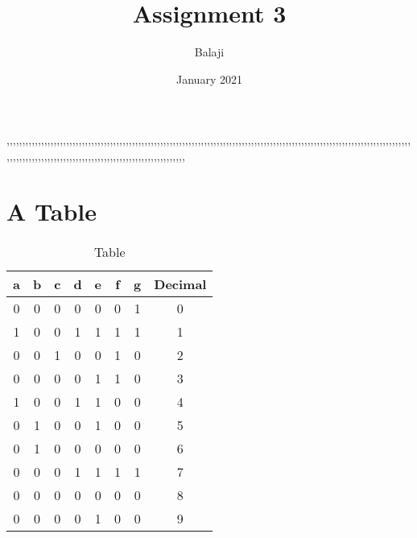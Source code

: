\documentclass{article}
\title{ Assignment 3}
\author{ Balaji }
\date{January 2021}
\begin{document}
\maketitle,,,,,,,,,,,,,,,,,,,,,,,,,,,,,,,,,,,,,,,,,,,,,,,,,,,,,,,,,,,,,,,,,,,,,,,,,,,,,,,,,,,,,,,,,,,,,,,,,,,,,,,,,,,,,,,,,,,,,,,,,,,,,,,,,,,,,,,,,,,,,,,,,,,,,,,,,,,,,,,,,,,,,,,,,,,,,,,,,,,,,,,,,,

\section{A Table}
\begin{table}[h]
\centering
\begin{tabular}{|c|c|c|c|c|c|c|c|}
\hline
\textbf{a} & \textbf{b} & \textbf{c} & \textbf{d} & \textbf{e} & \textbf{f} & \textbf{g} & \textbf{Decimal} \\ \hline

0&0&0&0&0&0&1&0\\\hline
1&0&0&1&1&1&1&1\\\hline
0&0&1&0&0&1&0&2\\\hline
0&0&0&0&1&1&0&3\\\hline
1&0&0&1&1&0&0&4\\\hline
0&1&0&0&1&0&0&5\\\hline
0&1&0&0&0&0&0&6\\\hline
0&0&0&1&1&1&1&7\\\hline
0&0&0&0&0&0&0&8\\\hline
0&0&0&0&1&0&0&9\\\hline



\hline
\end{tabular}
\caption{Table}
\label{tab:table1}
\end{table}
\end{document}
